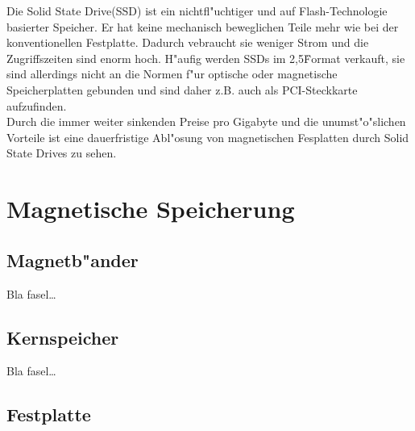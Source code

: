 				Die Solid State Drive(SSD) ist ein nichtfl"uchtiger und auf Flash-Technologie basierter Speicher. Er hat keine mechanisch beweglichen Teile mehr wie bei der konventionellen Festplatte. Dadurch vebraucht sie weniger Strom und die Zugriffszeiten sind enorm hoch. H"aufig werden SSDs im 2,5\" Format verkauft, sie sind allerdings nicht an die Normen f"ur optische oder magnetische Speicherplatten gebunden und sind daher z.B. auch als PCI-Steckkarte aufzufinden.
				\\
				Durch die immer weiter sinkenden Preise pro Gigabyte und die unumst"o"slichen Vorteile ist eine dauerfristige Abl"osung von magnetischen Fesplatten durch Solid State Drives zu sehen.
				
				
			
			
			
    \section{Magnetische Speicherung}
    \label{ch:Technisch:sec:Magnetische Speicherung}
        \subsection{Magnetb"ander}
        \label{ch:Technisch:sec:Magnetische Speicherung:sub:Magnetb"ander}
        
            Bla fasel\ldots
            
        \subsection{Kernspeicher}
        \label{ch:Technisch:sec:Magnetische Speicherung:sub:Kernspeicher}
        
            Bla fasel\ldots
            
        \subsection{Festplatte}
        \label{ch:Technisch:sec:Magnetische Speicherung:sub:Festplatte}
        
